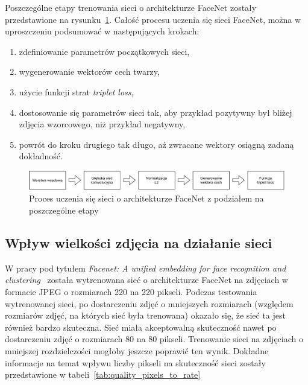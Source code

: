Poszczególne etapy trenowania sieci o architekturze FaceNet zostały przedstawione na rysunku~\ref{fig:facenet_arch}.
Całość procesu uczenia się sieci FaceNet, można w uproszczeniu podsumować w następujących krokach:

\begin{enumerate}
    \item zdefiniowanie parametrów początkowych sieci,
    \item wygenerowanie wektorów cech twarzy,
    \item użycie funkcji strat \textit{triplet loss},
    \item dostosowanie się parametrów sieci tak, aby przykład pozytywny był bliżej zdjęcia wzorcowego, niż przykład negatywny,
    \item powrót do kroku drugiego tak długo, aż zwracane wektory osiągną zadaną dokładność.
\end{enumerate}

\bigskip
\bigskip

\begin{figure}[H]
    \centering
    \includegraphics[width=1\textwidth]{images/facenet_arch}
    \caption{ Proces uczenia się sieci o architekturze FaceNet z podziałem na poszczególne etapy }
    \customsource
    \label{fig:facenet_arch}
\end{figure}

\subsection{Wpływ wielkości zdjęcia na działanie sieci}

W pracy pod tytułem \textit{Facenet: A unified embedding for face recognition and clustering}~\cite{schroff2015facenet}
została wytrenowana sieć o architekturze FaceNet na zdjęciach w formacie JPEG o rozmiarach 220 na 220 pikseli.
Podczas testowania wytrenowanej sieci, po dostarczeniu zdjęć o mniejszych rozmiarach (względem rozmiarów
zdjęć, na których sieć była trenowana) okazało się, że sieć ta jest również bardzo skuteczna.
Sieć miała akceptowalną skuteczność nawet po dostarczeniu zdjęć o rozmiarach 80 na 80 pikseli.
Trenowanie sieci na zdjęciach o mniejszej rozdzielczości mogłoby jeszcze poprawić ten wynik.
Dokładne informacje na temat wpływu liczby pikseli na
skuteczność sieci zostały przedstawione w tabeli~\ref{tab:quality_pixels_to_rate}

